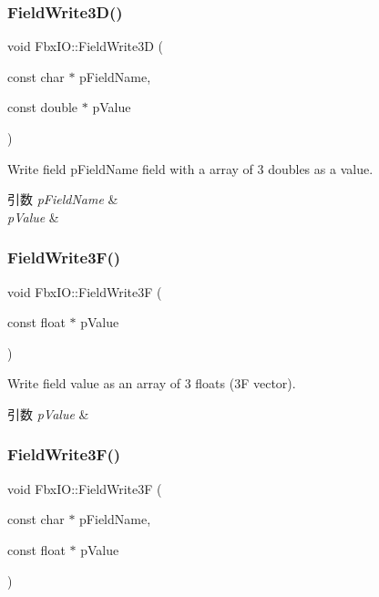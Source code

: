 \subsubsection{\texorpdfstring{Field\+Write3\+D()}{FieldWrite3D()}\hspace{0.1cm}{\footnotesize\ttfamily [2/2]}}
{\footnotesize\ttfamily void Fbx\+I\+O\+::\+Field\+Write3D (\begin{DoxyParamCaption}\item[{const char $\ast$}]{p\+Field\+Name,  }\item[{const double $\ast$}]{p\+Value }\end{DoxyParamCaption})}

Write field p\+Field\+Name field with a array of 3 doubles as a value. 
\begin{DoxyParams}{引数}
{\em p\+Field\+Name} & \\
\hline
{\em p\+Value} & \\
\hline
\end{DoxyParams}
\mbox{\label{class_fbx_i_o_a0f6d181f3a938935b34c5a82a41d000f}} 
\subsubsection{\texorpdfstring{Field\+Write3\+F()}{FieldWrite3F()}\hspace{0.1cm}{\footnotesize\ttfamily [1/2]}}
{\footnotesize\ttfamily void Fbx\+I\+O\+::\+Field\+Write3F (\begin{DoxyParamCaption}\item[{const float $\ast$}]{p\+Value }\end{DoxyParamCaption})}

Write field value as an array of 3 floats (3F vector). 
\begin{DoxyParams}{引数}
{\em p\+Value} & \\
\hline
\end{DoxyParams}
\mbox{\label{class_fbx_i_o_aa2c2df36a89f3e16f0f6029eb5132f26}} 
\subsubsection{\texorpdfstring{Field\+Write3\+F()}{FieldWrite3F()}\hspace{0.1cm}{\footnotesize\ttfamily [2/2]}}
{\footnotesize\ttfamily void Fbx\+I\+O\+::\+Field\+Write3F (\begin{DoxyParamCaption}\item[{const char $\ast$}]{p\+Field\+Name,  }\item[{const float $\ast$}]{p\+Value }\end{DoxyParamCaption})}

